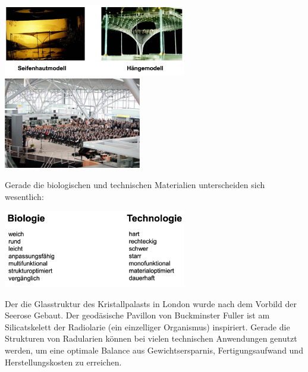 \begin{center}
    \includegraphics[width=8cm]{lec7/figures/seife.png}
    \hfill
    \includegraphics[width=6cm]{lec7/figures/flughafen.png}
\end{center}
Gerade die biologischen und technischen Materialien unterscheiden sich wesentlich:

\begin{center}
    \includegraphics[width=8cm]{lec7/figures/material.png}
\end{center}
Der die Glasstruktur des Kristallpalasts in London wurde nach dem Vorbild der Seerose Gebaut. Der geodäsische Pavillon von Buckminster Fuller ist am Silicatskelett der Radiolarie (ein einzelliger Organismus) inspiriert. Gerade die Strukturen von Radularien können bei vielen technischen Anwendungen genutzt werden, um eine optimale Balance aus Gewichtsersparnis, Fertigungsaufwand und Herstellungskosten zu erreichen.

